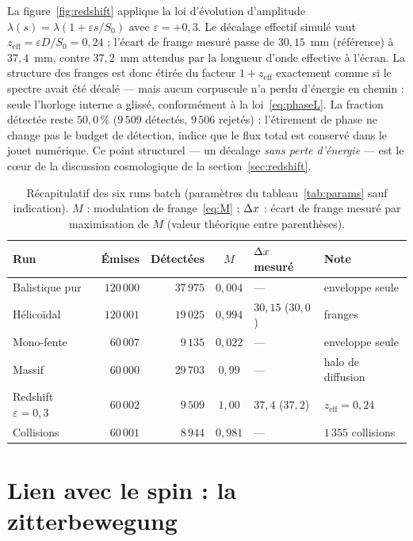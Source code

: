 La figure~\ref{fig:redshift} applique la loi d'évolution d'amplitude
$\lambda(s) = \lambda(1 + \varepsilon s/S_0)$ avec $\varepsilon = +0{,}3$. Le
décalage effectif simulé vaut $z_{\mathrm{eff}} = \varepsilon D/S_0 = 0{,}24$ ;
l'écart de frange mesuré passe de $30{,}15$~mm (référence) à $37{,}4$~mm, contre
$37{,}2$~mm attendus par la longueur d'onde effective à l'écran. La structure
des franges est donc étirée du facteur $1+z_{\mathrm{eff}}$ exactement comme si
le spectre avait été décalé --- mais aucun corpuscule n'a perdu d'énergie en
chemin : seule l'horloge interne a glissé, conformément à la
loi~\eqref{eq:phaseL}. La fraction détectée reste $50{,}0\,\%$
($9\,509$ détectés, $9\,506$ rejetés) : l'étirement de phase ne change pas le
budget de détection, indice que le flux total est conservé dans le jouet
numérique. Ce point structurel --- un décalage \emph{sans perte d'énergie} ---
est le cœur de la discussion cosmologique de la section~\ref{sec:redshift}.

\begin{table}[t]
\centering\small
\caption{Récapitulatif des six runs batch (paramètres du
tableau~\ref{tab:params} sauf indication). $M$ : modulation de
frange~\eqref{eq:M} ; $\Delta x$ : écart de frange mesuré par maximisation de $M$
(valeur théorique entre parenthèses).}
\label{tab:runs}
\begin{tabular}{@{}l r r c l l@{}}
\toprule
Run & Émises & Détectées & $M$ & $\Delta x$ mesuré & Note \\
\midrule
Balistique pur   & $120\,000$ & $37\,975$ & $0{,}004$ & --- & enveloppe seule \\
Hélicoïdal       & $120\,001$ & $19\,025$ & $0{,}994$ & $30{,}15$ ($30{,}0$) & franges \\
Mono-fente       & $60\,007$  & $9\,135$  & $0{,}022$ & --- & enveloppe seule \\
Massif           & $60\,000$  & $29\,703$ & $0{,}99$  & --- & halo de diffusion \\
Redshift $\varepsilon = 0{,}3$ & $60\,002$ & $9\,509$ & $1{,}00$ & $37{,}4$ ($37{,}2$) & $z_{\mathrm{eff}} = 0{,}24$ \\
Collisions       & $60\,001$  & $8\,944$  & $0{,}981$ & --- & $1\,355$ collisions \\
\bottomrule
\end{tabular}
\end{table}

\section{Lien avec le spin : la zitterbewegung}\label{sec:spin}

